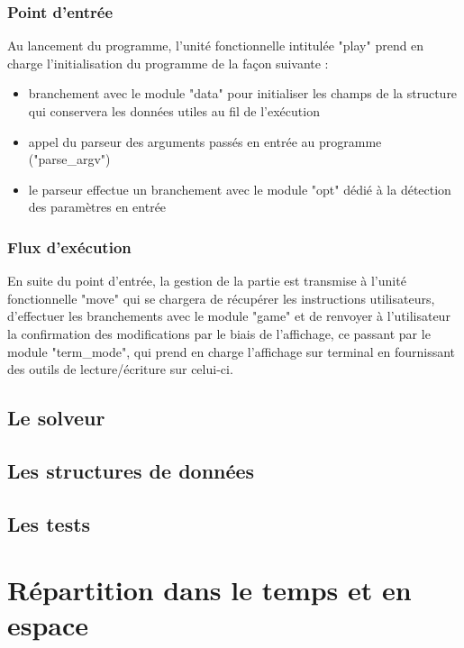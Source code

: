 \documentclass{report}
\begin{document}
\subsubsection*{Point d'entrée}
Au lancement du programme, l'unité fonctionnelle intitulée "play" prend en charge l'initialisation du programme de la façon suivante :
\begin{itemize}
\item branchement avec le module "data" pour initialiser les champs de la structure qui conservera les données utiles au fil de l'exécution
\item appel du parseur des arguments passés en entrée au programme ("parse\_argv")
\item le parseur effectue un branchement avec le module "opt" dédié à la détection des paramètres en entrée
\end{itemize}
\subsubsection*{Flux d'exécution}
En suite du point d'entrée, la gestion de la partie est transmise à l'unité fonctionnelle "move" qui se chargera de récupérer les instructions utilisateurs, d'effectuer les branchements avec le module "game" et de renvoyer à l'utilisateur la confirmation des modifications par le biais de l'affichage, ce passant par le module "term\_mode", qui prend en charge l'affichage sur terminal en fournissant des outils de lecture/écriture sur celui-ci.

\subsection{Le solveur}

\subsection{Les structures de données}

\subsection{Les tests}

\section{Répartition dans le temps et en espace}
\end{document}
